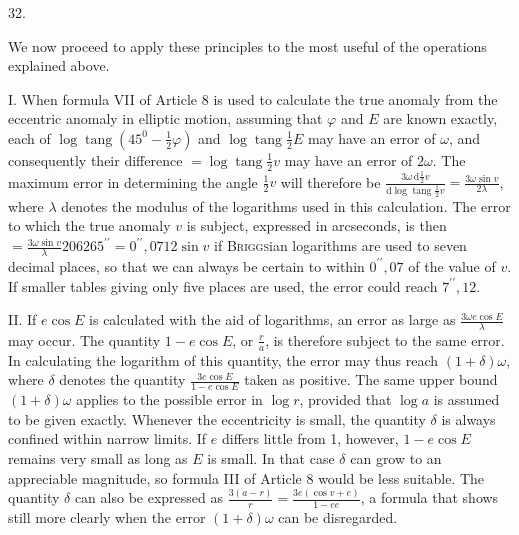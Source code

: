 \par{}
\begin{center}
\hypertarget{native-047-article032}{}32.
\end{center}
We now proceed to apply these principles to the most useful of the operations explained above.

I. When formula VII of Article 8 is used to calculate the true anomaly from the eccentric anomaly in elliptic motion, assuming that $\varphi$ and $E$ are known exactly, each of $\log\operatorname{tang}(45^0-\frac{1}{2}\varphi)$ and $\log\operatorname{tang}\frac{1}{2}E$ may have an error of $\omega$, and consequently their difference $=\log\operatorname{tang}\frac{1}{2}v$ may have an error of $2\omega$. The maximum error in determining the angle $\frac{1}{2}v$ will therefore be $\frac{3\omega\,\mathrm{d}\frac{1}{2}v}{\mathrm{d}\log\operatorname{tang}\frac{1}{2}v}=\frac{3\omega\sin v}{2\lambda}$, where $\lambda$ denotes the modulus of the logarithms used in this calculation. The error to which the true anomaly $v$ is subject, expressed in arcseconds, is then $=\frac{3\omega\sin v}{\lambda}206265^{\prime\prime}=0^{\prime\prime}{,}0712\sin v$ if \textsc{Briggs}ian logarithms are used to seven decimal places, so that we can always be certain to within $0^{\prime\prime}{,}07$ of the value of $v$. If smaller tables giving only five places are used, the error could reach $7^{\prime\prime}{,}12$.

II. If $e\cos E$ is calculated with the aid of logarithms, an error as large as $\frac{3\omega e\cos E}{\lambda}$ may occur. The quantity $1-e\cos E$, or $\frac{r}{a}$, is therefore subject to the same error. In calculating the logarithm of this quantity, the error may thus reach $(1+\delta)\omega$, where $\delta$ denotes the quantity $\frac{3e\cos E}{1-e\cos E}$ taken as positive. The same upper bound $(1+\delta)\omega$ applies to the possible error in $\log r$, provided that $\log a$ is assumed to be given exactly. Whenever the eccentricity is small, the quantity $\delta$ is always confined within narrow limits. If $e$ differs little from 1, however, $1-e\cos E$ remains very small as long as $E$ is small. In that case $\delta$ can grow to an appreciable magnitude, so formula III of Article 8 would be less suitable. The quantity $\delta$ can also be expressed as $\frac{3(a-r)}{r}=\frac{3e(\cos v+e)}{1-ee}$, a formula that shows still more clearly when the error $(1+\delta)\omega$ can be disregarded.

